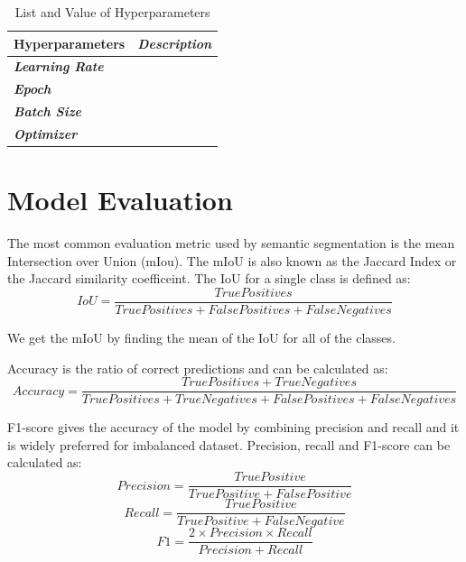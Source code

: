 \begin{table}[!h]
\centering
\begin{tabular}{|l|l|}
\hline
\multicolumn{1}{|c|}{\textbf{Hyperparameters}} & \multicolumn{1}{c|}{\textit{\textbf{Description}}} \\ \hline
\textit{\textbf{Learning Rate}}                &                                                    \\ \hline
\textit{\textbf{Epoch}}                        &                                                    \\ \hline
\textit{\textbf{Batch Size}}                   &                                                    \\ \hline
\textit{\textbf{Optimizer}}                    &                                                    \\ \hline
\end{tabular}
\caption{List and Value of Hyperparameters}
\label{tab:hyperparam-value}

\end{table}

\section{Model Evaluation}

The most common evaluation metric used by semantic segmentation is the mean Intersection over Union (mIou). The mIoU is also known as the Jaccard Index or the Jaccard similarity coefficeint. The IoU for a single class is defined as:
\begin{equation}
    IoU = \frac{True Positives}{True Positives + False Positives + False Negatives}
\end{equation}

We get the mIoU by finding the mean of the IoU for all of the classes.

Accuracy is the ratio of correct predictions and can be calculated as:
\begin{equation}
     Accuracy = \frac{True Positives + True Negatives}{True Positives + True Negatives + False Positives + False Negatives}
 \end{equation}

 F1-score gives the accuracy of the model by combining precision and recall and it is widely preferred for imbalanced dataset. Precision, recall and F1-score can be calculated as:
 \begin{equation}
     Precision = \frac{True Positive}{True Positive + False Positive}
 \end{equation}
 \begin{equation}
     Recall = \frac{True Positive}{True Positive + False Negative}
 \end{equation}
\begin{equation}
     F1 = \frac{2 \times Precision \times Recall}{Precision + Recall}
 \end{equation}

